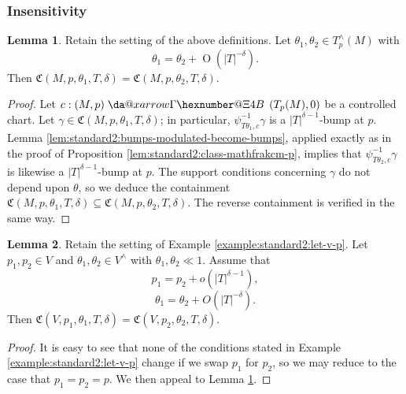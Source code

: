 \documentclass[reqno]{amsart}
\makeatletter
\newcommand*{\da@rightarrow}{\mathchar"0\hexnumber@\symAMSa 4B }
\newcommand*{\xdashrightarrow}[2][]{%
  \mathrel{%
    \mathpalette{\da@xarrow{#1}{#2}{}\da@rightarrow{\,}{}}{}%
  }%
}
\newcommand*{\da@xarrow}[7]{%
  \sbox0{$\ifx#7\scriptstyle\scriptscriptstyle\else\scriptstyle\fi#5#1#6\m@th$}%
  \sbox2{$\ifx#7\scriptstyle\scriptscriptstyle\else\scriptstyle\fi#5#2#6\m@th$}%
  \sbox4{$#7\dabar@\m@th$}%
  \dimen@=\wd0 %
  \ifdim\wd2 >\dimen@
    \dimen@=\wd2 %
  \fi
  \count@=2 %
  \def\da@bars{\dabar@\dabar@}%
  \@whiledim\count@\wd4<\dimen@\do{%
    \advance\count@\@ne
    \expandafter\def\expandafter\da@bars\expandafter{%
      \da@bars
      \dabar@ 
    }%
  }%
  \mathrel{#3}%
  \mathrel{%
    \mathop{\da@bars}\limits
    \ifx\\#1\\%
    \else
      _{\copy0}%
    \fi
    \ifx\\#2\\%
    \else
      ^{\copy2}%
    \fi
  }%
  \mathrel{#4}%
}
\def\O{\operatorname{O}}
\theoremstyle{plain} \newtheorem{theorem} {Theorem}
\theoremstyle{definition} \newtheorem{definition} [theorem] {Definition}
\theoremstyle{itplain} %
\newtheorem{lemma}[theorem]{Lemma}
\numberwithin{equation}{section}
\numberwithin{theorem}{section}
\makeatother
\begin{document}
\subsubsection{Insensitivity}


\begin{lemma}\label{lem:standard2:retain-setting-above}
  Retain the setting of the above definitions.  Let $\theta_1, \theta_2 \in T_p^\wedge(M)$ with
  \begin{equation*}
    \theta_1 = \theta_2 + \O(|T|^{-\delta}).
  \end{equation*}
  Then $\mathfrak{C}(M,p,\theta_1,T,\delta) = \mathfrak{C}(M,p,\theta_2,T,\delta)$.
\end{lemma}
\begin{proof}
  Let $c : (M, p) \xdashrightarrow{} (T_p(M), 0)$ be a controlled chart.  Let $\gamma \in \mathfrak{C}(M,p,\theta_1,T,\delta)$; in particular, $\psi_{T \theta_1, c}^{-1} \gamma$ is a $|T|^{\delta-1}$-bump at $p$.  Lemma \ref{lem:standard2:bumps-modulated-become-bumps}, applied exactly as in the proof of Proposition \ref{lem:standard2:class-mathfrakcm-p}, implies that $\psi_{T \theta_2, c}^{-1} \gamma$ is likewise a $|T|^{\delta-1}$-bump at $p$.  The support conditions concerning $\gamma$ do not depend upon $\theta$, so we deduce the containment $\mathfrak{C}(M,p,\theta_1,T,\delta) \subseteq \mathfrak{C}(M,p,\theta_2,T,\delta)$.  The reverse containment is verified in the same way.
\end{proof}

\begin{lemma}\label{lem:insensitivity}
  Retain the setting of Example \ref{example:standard2:let-v-p}.  Let $p_1, p_2 \in V$ and $\theta_1, \theta_2 \in V^\wedge$ with $\theta_1, \theta_2 \ll 1$.  Assume that
  \begin{equation*}
    p_1 = p_2 + o(|T|^{\delta-1}),
  \end{equation*}
  \begin{equation*}
    \theta_1 = \theta_2 + O(|T|^{-\delta}).
  \end{equation*}
  Then $\mathfrak{C}(V,p_1,\theta_1,T,\delta) = \mathfrak{C}(V,p_2,\theta_2,T,\delta)$.
\end{lemma}
\begin{proof}
  It is easy to see that none of the conditions stated in Example  \ref{example:standard2:let-v-p} change if we swap $p_1$ for $p_2$, so we may reduce to the case that $p_1 = p_2 = p$.  We then appeal to Lemma \ref{lem:standard2:retain-setting-above}.
\end{proof}
\end{document}
